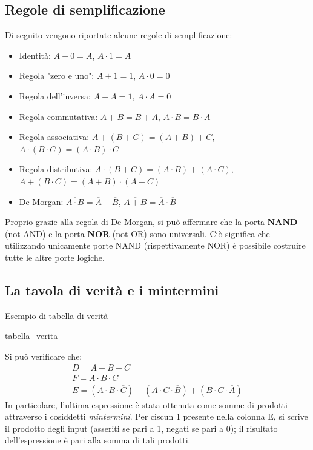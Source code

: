 \documentclass[class=book, crop=false]{standalone}
\begin{document}
\subsection{Regole di semplificazione}
\label{subsec:semplificazione}
Di seguito vengono riportate alcune regole di semplificazione:
\begin{itemize}
	\item Identità: \(A+0=A\), \(A\cdot 1=A\)
	\item Regola "zero e uno": \(A+1=1\), \(A\cdot 0=0\)
	\item Regola dell'inversa: \(A+\overline{A}=1\), \(A\cdot\overline{A}=0\)
	\item Regola commutativa: \(A+B=B+A\), \(A\cdot B=B\cdot A\)
	\item Regola associativa: \(A+(B+C)=(A+B)+C\), \(A\cdot(B\cdot C)=(A\cdot B)\cdot C\)
	\item Regola distributiva: \(A\cdot(B+C)=(A\cdot B)+(A\cdot C)\), \(A+(B\cdot C)=(A+B)\cdot(A+C)\)
	\item De Morgan: \(\overline{A\cdot B} = \overline{A}+\overline{B}\), \(\overline{A+B} = \overline{A}\cdot\overline{B}\)
\end{itemize}
Proprio grazie alla regola di De Morgan, si può affermare che la porta \textbf{NAND} (not AND) e la porta \textbf{NOR} (not OR) sono universali. Ciò significa che utilizzando unicamente porte NAND (rispettivamente NOR) è possibile costruire tutte le altre porte logiche.
\subsection{La tavola di verità e i mintermini}
\label{subsec:mintermini}
\begin{table}[!h]
	\centering
	\caption{Esempio di tabella di verità}
	{tabella_verita}
	\label{tabella-verita}
\end{table}
Si può verificare che:
\begin{gather*}
D = A+B+C\\
F = A\cdot B\cdot C\\
E = (A\cdot B\cdot\overline{C}) + (A\cdot C\cdot\overline{B}) + (B\cdot C\cdot\overline{A})
\end{gather*}
In particolare, l'ultima espressione è stata ottenuta come somme di prodotti attraverso i cosiddetti \emph{mintermini}. Per ciscun 1 presente nella colonna E, si scrive il prodotto degli input (asseriti se pari a 1, negati se pari a 0); il risultato dell'espressione è pari alla somma di tali prodotti.
\end{document}
